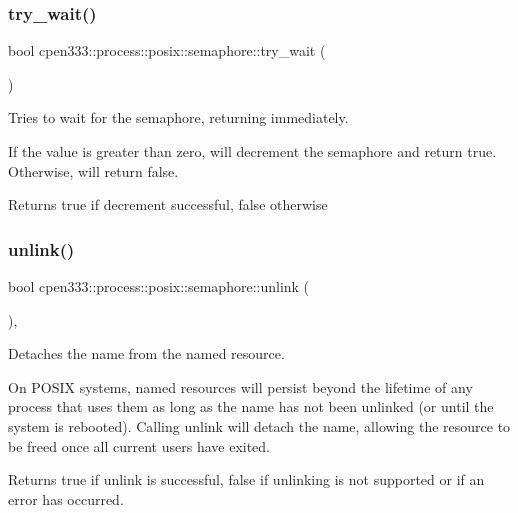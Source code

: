 \subsubsection{\texorpdfstring{try\+\_\+wait()}{try\_wait()}}
{\footnotesize\ttfamily bool cpen333\+::process\+::posix\+::semaphore\+::try\+\_\+wait (\begin{DoxyParamCaption}{ }\end{DoxyParamCaption})\hspace{0.3cm}{\ttfamily [inline]}}



Tries to wait for the semaphore, returning immediately. 

If the value is greater than zero, will decrement the semaphore and return true. Otherwise, will return false.

\begin{DoxyReturn}{Returns}
true if decrement successful, false otherwise 
\end{DoxyReturn}
\mbox{\label{classcpen333_1_1process_1_1posix_1_1semaphore_aa6064e2c4b4b7282cc5e6eda877ee1bb}} 
\subsubsection{\texorpdfstring{unlink()}{unlink()}\hspace{0.1cm}{\footnotesize\ttfamily [1/2]}}
{\footnotesize\ttfamily bool cpen333\+::process\+::posix\+::semaphore\+::unlink (\begin{DoxyParamCaption}{ }\end{DoxyParamCaption})\hspace{0.3cm}{\ttfamily [inline]}, {\ttfamily [virtual]}}



Detaches the name from the named resource. 

On P\+O\+S\+IX systems, named resources will persist beyond the lifetime of any process that uses them as long as the name has not been unlinked (or until the system is rebooted). Calling {\ttfamily unlink} will detach the name, allowing the resource to be freed once all current users have exited.

\begin{DoxyReturn}{Returns}
{\ttfamily true} if unlink is successful, {\ttfamily false} if unlinking is not supported or if an error has occurred. 
\end{DoxyReturn}



